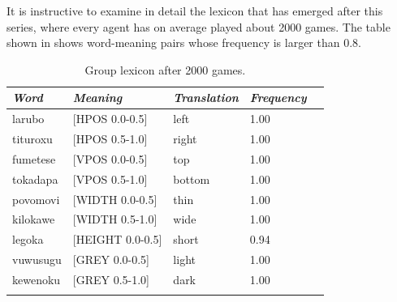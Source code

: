 It is instructive to examine in detail the lexicon 
that has emerged after this series, where every agent
has on average played about 2000 games. The table shown in  
shows word-meaning pairs whose 
frequency is larger than 0.8. 
\begin{table}
\begin{center}
\begin{tabular}{ l  l  l  l  l }
\lsptoprule
{\itshape Word}&{\itshape Meaning}& {\itshape Translation} & {\itshape Frequency} \\ \midrule
larubo & [HPOS 0.0-0.5] & left & 1.00 \\ 
tituroxu & [HPOS 0.5-1.0] & right & 1.00 \\ 
fumetese & [VPOS 0.0-0.5] & top & 1.00 \\ 
tokadapa & [VPOS 0.5-1.0] & bottom & 1.00 \\ 
povomovi & [WIDTH 0.0-0.5] & thin & 1.00 \\ 
kilokawe & [WIDTH 0.5-1.0] & wide & 1.00 \\ 
legoka & [HEIGHT 0.0-0.5] & short & 0.94\\  
vuwusugu & [GREY 0.0-0.5] & light & 1.00 \\ 
kewenoku & [GREY 0.5-1.0] & dark & 1.00 \\ 
\lspbottomrule
\end{tabular}
\caption{\label{tab:after2000} Group lexicon after 2000 games.}
\end{center}
\end{table}

